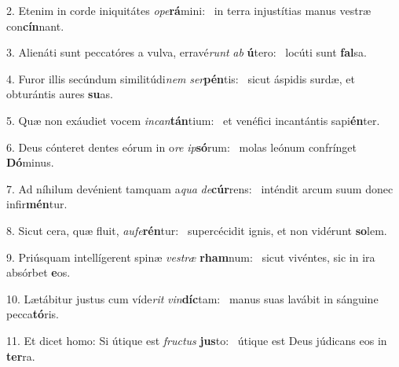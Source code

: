 2. Etenim in corde iniquitátes \textit{o}\textit{pe}\textbf{rá}mini: \ast\  in terra injustítias manus vestræ con\textbf{cín}nant.\

3. Alienáti sunt peccatóres a vulva, erravé\textit{runt} \textit{ab} \textbf{ú}tero: \ast\  locúti sunt \textbf{fal}sa.\

4. Furor illis secúndum similitúdi\textit{nem} \textit{ser}\textbf{pén}tis: \ast\  sicut áspidis surdæ, et obturántis aures \textbf{su}as.\

5. Quæ non exáudiet vocem \textit{in}\textit{can}\textbf{tán}tium: \ast\  et venéfici incantántis sapi\textbf{én}ter.\

6. Deus cónteret dentes eórum in o\textit{re} \textit{ip}\textbf{só}rum: \ast\  molas leónum confrínget \textbf{Dó}minus.\

7. Ad níhilum devénient tamquam a\textit{qua} \textit{de}\textbf{cúr}rens: \ast\  inténdit arcum suum donec infir\textbf{mén}tur.\

8. Sicut cera, quæ fluit, \textit{au}\textit{fe}\textbf{rén}tur: \ast\  supercécidit ignis, et non vidérunt \textbf{so}lem.\

9. Priúsquam intellígerent spinæ \textit{ves}\textit{træ} \textbf{rham}num: \ast\  sicut vivéntes, sic in ira absórbet \textbf{e}os.\

10. Lætábitur justus cum víde\textit{rit} \textit{vin}\textbf{díc}tam: \ast\  manus suas lavábit in sánguine pecca\textbf{tó}ris.\

11. Et dicet homo: Si útique est \textit{fruc}\textit{tus} \textbf{jus}to: \ast\  útique est Deus júdicans eos in \textbf{ter}ra.\

